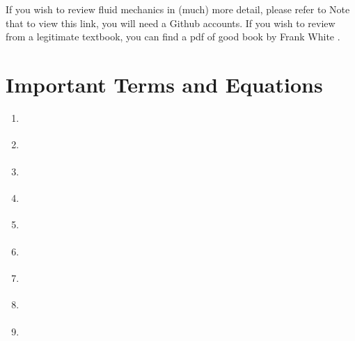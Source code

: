 \documentclass[letterpaper,10pt,english]{sphinxmanual}
\begin{document}
If you wish to review fluid mechanics in (much) more detail, please refer to  Note that to view this link, you will need a Github accounts. If you wish to review from a legitimate textbook, you can find a pdf of good book by Frank White .


\section{Important Terms and Equations}
\label{\detokenize{Review/Review_Fluid_Mechanics:important-terms-and-equations}}\label{\detokenize{Review/Review_Fluid_Mechanics:heading-fluids-terms-eqs}}
\begin{enumerate}
\item {} 
{\hyperref[\detokenize{Review/Review_Fluid_Mechanics:heading-laminar-and-turbulent-flow}]{}}

\item {} 
{\hyperref[\detokenize{Review/Review_Fluid_Mechanics:heading-laminar-and-turbulent-flow}]{}}

\item {} 
{\hyperref[\detokenize{Review/Review_Fluid_Mechanics:heading-laminar-and-turbulent-flow}]{}}

\item {} 
{\hyperref[\detokenize{Review/Review_Fluid_Mechanics:heading-streamlines-and-control-volumes}]{}}

\item {} 
{\hyperref[\detokenize{Review/Review_Fluid_Mechanics:heading-streamlines-and-control-volumes}]{}}

\item {} 
{\hyperref[\detokenize{Review/Review_Fluid_Mechanics:heading-bernoulli-equation}]{}}

\item {} 
{\hyperref[\detokenize{Review/Review_Fluid_Mechanics:heading-head-loss}]{}}

\item {} 
{\hyperref[\detokenize{Review/Review_Fluid_Mechanics:heading-head-loss-elevation-difference-trick}]{}}

\item {} 
{\hyperref[\detokenize{Review/Review_Fluid_Mechanics:heading-what-is-a-vena-contracta}]{}}

\end{enumerate}
\end{document}
